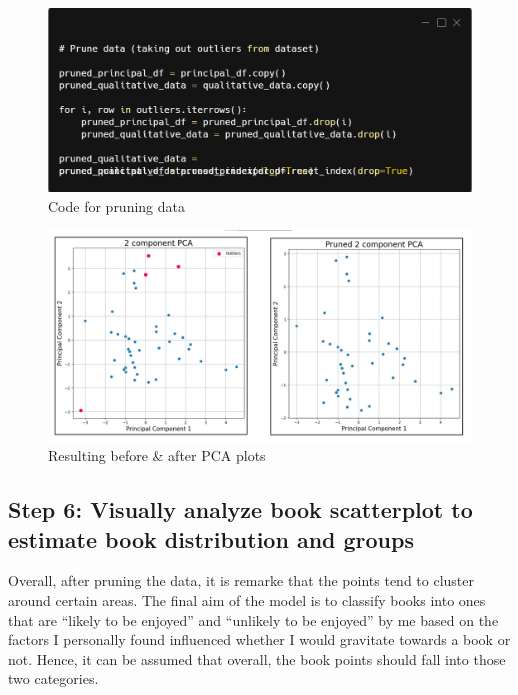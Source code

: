 \documentclass[12pt]{article}
\begin{document}
\begin{figure}[H]
	\includegraphics[width=\textwidth]{code4}
	\centering
	\caption{Code for pruning data}
\end{figure}
\vspace{-1em}
\begin{figure}[H]
	\includegraphics[scale=0.4]{6}
	\centering
	\caption{Resulting before \& after PCA plots}
\end{figure}

\subsection{Step 6: Visually analyze book scatterplot to estimate book distribution and groups}
Overall, after pruning the data, it is remarke that the points tend to cluster around certain areas. The final aim of the model is to classify books into ones that are “likely to be enjoyed” and “unlikely to be enjoyed” by me based on the factors I personally found influenced whether I would gravitate towards a book or not. Hence, it can be assumed that overall, the book points should fall into those two categories.
\end{document}
